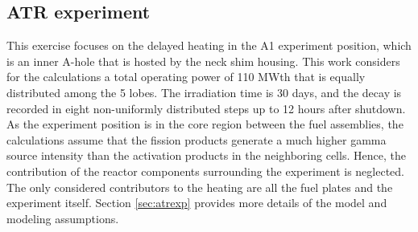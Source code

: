 
\subsection{ATR experiment}


This exercise focuses on the delayed heating in the A1 experiment position, which is an inner A-hole that is hosted by the neck shim housing.
This work considers for the calculations a total operating power of 110 MWth that is equally distributed among the 5 lobes.
The irradiation time is 30 days, and the decay is recorded in eight non-uniformly distributed steps up to 12 hours after shutdown.
As the experiment position is in the core region between the fuel assemblies, the calculations assume that the fission products generate a much higher gamma source intensity than the activation products in the neighboring cells.
Hence, the contribution of the reactor components surrounding the experiment is neglected.
The only considered contributors to the heating are all the fuel plates and the experiment itself.
Section \ref{sec:atrexp} provides more details of the model and modeling assumptions.

